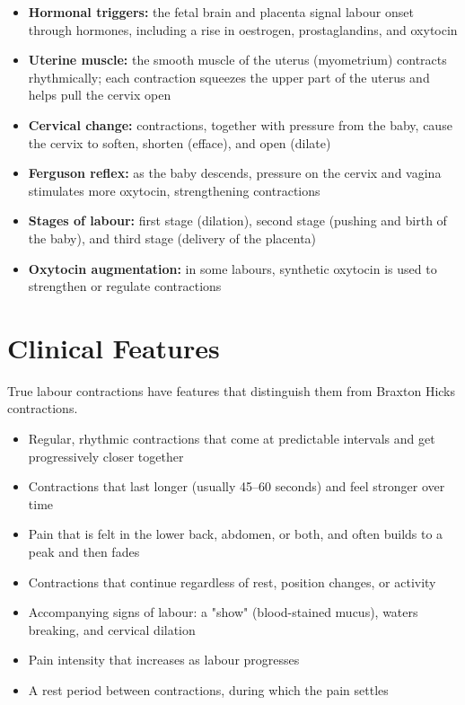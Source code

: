 \begin{itemize}
    \item \textbf{Hormonal triggers:} the fetal brain and placenta signal labour onset through hormones, including a rise in oestrogen, prostaglandins, and oxytocin
    \item \textbf{Uterine muscle:} the smooth muscle of the uterus (myometrium) contracts rhythmically; each contraction squeezes the upper part of the uterus and helps pull the cervix open
    \item \textbf{Cervical change:} contractions, together with pressure from the baby, cause the cervix to soften, shorten (efface), and open (dilate)
    \item \textbf{Ferguson reflex:} as the baby descends, pressure on the cervix and vagina stimulates more oxytocin, strengthening contractions
    \item \textbf{Stages of labour:} first stage (dilation), second stage (pushing and birth of the baby), and third stage (delivery of the placenta)
    \item \textbf{Oxytocin augmentation:} in some labours, synthetic oxytocin is used to strengthen or regulate contractions
\end{itemize}

\section*{Clinical Features}
True labour contractions have features that distinguish them from Braxton Hicks contractions.

\begin{itemize}
    \item Regular, rhythmic contractions that come at predictable intervals and get progressively closer together
    \item Contractions that last longer (usually 45--60 seconds) and feel stronger over time
    \item Pain that is felt in the lower back, abdomen, or both, and often builds to a peak and then fades
    \item Contractions that continue regardless of rest, position changes, or activity
    \item Accompanying signs of labour: a "show" (blood-stained mucus), waters breaking, and cervical dilation
    \item Pain intensity that increases as labour progresses
    \item A rest period between contractions, during which the pain settles
\end{itemize}

